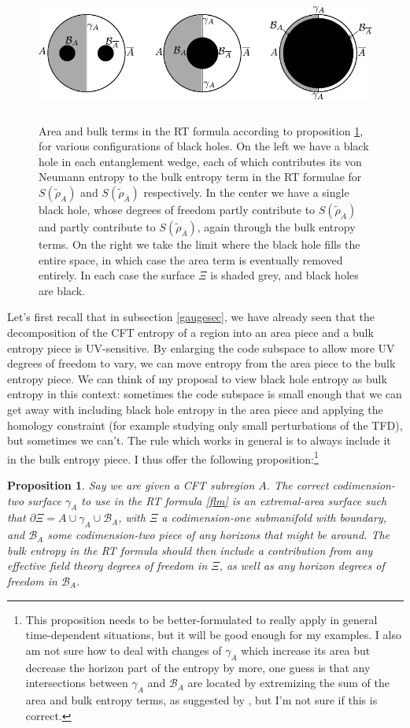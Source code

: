 \documentclass[12pt]{article}
\newcommand{\bfig}{\begin{figure}\begin{center}}
\newcommand{\efig}{\end{center}\end{figure}}
\newcommand{\wt}{\widetilde}
\newcommand{\Ab}{\ol{A}}
\newcommand{\ol}{\overline}
\newtheorem{prop}{Proposition}[section]
\begin{document}
\bfig
\includegraphics[height=4.5cm]{blackholes.pdf}
\caption{Area and bulk terms in the RT formula according to proposition \ref{bhprop}, for various configurations of black holes.  On the left we have a black hole in each entanglement wedge, each of which contributes its von Neumann entropy to the bulk entropy term in the RT formulae for $S(\wt{\rho}_A)$ and $S(\wt{\rho}_{\Ab})$ respectively.  In the center we have a single black hole, whose degrees of freedom partly contribute to $S(\wt{\rho}_A)$ and partly contribute to $S(\wt{\rho}_{\Ab})$, again through the bulk entropy terms. On the right we take the limit where the black hole fills the entire space, in which case the area term is eventually removed entirely.  In each case the surface $\Xi$ is shaded grey, and black holes are black.}\label{bhfig}
\efig
Let's first recall that in subsection \ref{gaugesec}, we have already seen that the decomposition of the CFT entropy of a region into an area piece and a bulk entropy piece is UV-sensitive.  By enlarging the code subspace to allow more UV degrees of freedom to vary, we can move entropy from the area piece to the bulk entropy piece.  We can think of my proposal to view black hole entropy as bulk entropy in this context: sometimes the code subspace is small enough that we can get away with including black hole entropy in the area piece and applying the homology constraint (for example studying only small perturbations of the TFD), but sometimes we can't.  The rule which works in general is to always include it in the bulk entropy piece.  I thus offer the following proposition:\footnote{This proposition needs to be better-formulated to really apply in general time-dependent situations, but it will be good enough for my examples.  I also am not sure how to deal with changes of $\gamma_A$ which increase its area but decrease the horizon part of the entropy by more, one guess is that any intersections between $\gamma_A$ and $\mathcal{B}_A$ are located by extremizing the sum of the area and bulk entropy terms, as suggested by \cite{Engelhardt:2014gca}, but I'm not sure if this is correct.}
\begin{prop}\label{bhprop}
Say we are given a CFT subregion $A$.  The correct codimension-two surface $\gamma_A$ to use in the RT formula \eqref{flm} is an extremal-area surface such that $\partial \Xi=A \cup \gamma_A \cup \mathcal{B}_A$, with $\Xi$ a codimension-one submanifold with boundary, and $\mathcal{B}_A$ some codimension-two piece of any horizons that might be around.  The bulk entropy in the RT formula should then include a contribution from any effective field theory degrees of freedom in $\Xi$, as well as any horizon degrees of freedom in $\mathcal{B}_A$.  
\end{prop}
\end{document}
